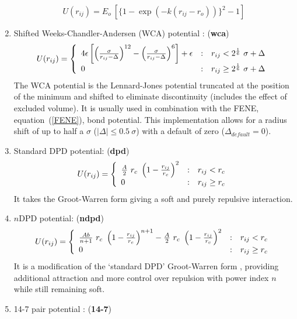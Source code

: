 \begin{enumerate}
\begin{equation}
U(r_{ij}) = E_{o}~[\{1-\exp(-k(r_{ij}-r_{o}))\}^{2}-1]
\end{equation}
\item Shifted Weeks-Chandler-Andersen (WCA) potential \cite{weeks-71a}:  ({\bf wca})
\begin{equation}
U(r_{ij}) = \left\{ \begin{array} {l@{\quad:\quad}l}
4\epsilon\left[\left(\frac{\sigma}{r_{ij}-\Delta}\right)^{12}-\left(\frac{\sigma}{r_{ij}-\Delta}\right)^{6}\right]
+\epsilon & r_{ij} < 2^{1 \over 6}~\sigma + \Delta \\
0 & r_{ij} \ge 2^{1 \over 6}~\sigma + \Delta \end{array} \right. \label{wca}
\end{equation}
The WCA potential is the Lennard-Jones potential truncated at the
position of the minimum and shifted to eliminate discontinuity
(includes the effect of excluded volume).  It is usually used in
combination with the FENE, equation~(\ref{FENE}), bond potential.  This
implementation allows for a radius shift of up to half a $\sigma$
($|\Delta| \le 0.5~\sigma$) with a default of zero ($\Delta_{default} = 0$).
\item Standard DPD potential:  ({\bf dpd})
\begin{equation}
U(r_{ij}) = \left\{ \begin{array} {l@{\quad:\quad}l}
\frac{A}{2}~r_{c}~\left(1-\frac{r_{ij}}{r_{c}}\right)^{2} & r_{ij} < r_{c} \\
0 & r_{ij} \ge r_{c} \end{array} \right.
\end{equation}
It takes the Groot-Warren \cite{groot-97a} form giving a soft and purely repulsive interaction.
\item $n$DPD potential:  ({\bf ndpd})
\begin{equation}
U(r_{ij}) = \left\{ \begin{array} {l@{\quad:\quad}l}
\frac{Ab}{n+1}~r_{c}~\left(1-\frac{r_{ij}}{r_{c}}\right)^{n+1} - \frac{A}{2}~r_{c}~\left(1-\frac{r_{ij}}{r_{c}}\right)^{2} & r_{ij} < r_{c} \\
0 & r_{ij} \ge r_{c} \end{array} \right.
\end{equation}
It is a modification of the `standard DPD' Groot-Warren form \cite{sokhan-23a}, providing additional attraction
and more control over repulsion with power index $n$ while still remaining soft.
\item 14-7 pair potential \cite{ponder-10a}:  ({\bf 14-7})

\end{enumerate}
